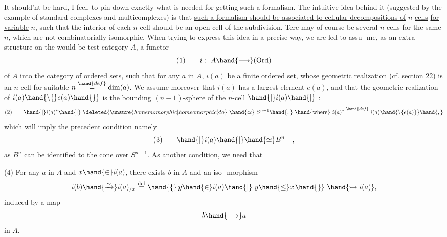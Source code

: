 
It should'nt be hard,  I feel,  to pin down exactly what is needed for
getting such a formalism.  The intuitive idea behind it (suggested by
the example of  standard complexes and multicomplexes)  is that
\uline{such a formalism should be associated to cellular decompositions of}
$n$-\uline{cells} \uline{for variable} $n$,  such that the interior of each $n$-cell should
be an open cell of the subdivision.  Tere may of course be several
$n$-cells for the same $n$,  which are not combinatorially isomorphic.
When trying to express this idea in a precise way,  we are led to assu-%
me,  as an extra structure on the would-be test category $A$,  a functor
\[ (1) \qquad i:\ A \hand{\longrightarrow} (\mathrm{Ord}) \]
of $A$ into the category of ordered sets,  such that for any $a$ in $A$,
$i(a)$ be a \uline{finite} ordered set,  whose geometric realization  (cf. section
22)  is an $n$-cell for suitable  $n \overset{\hand{def}}{=} \mathrm{dim}(a)$.  We assume moreover that
$i(a)$ has a largest element  $e(a)$,  and that the geometric realization
of  $i(a) \hand{\setminus\{} e(a) \hand{\}}$ is the bounding  $(n-1)$-sphere of the $n$-cell  $\hand{|} i(a) \hand{|}$ :
\[ (2) \qquad \hand{|} i(a)^{*} \hand{|}\ \deleted{\unsure{homemomorphic|homeomorphic} to}\ \hand{\simeq}\ S^{n-1} \hand{,}\ \hand{\text{where}}\ i(a)^{*} \overset{\hand{def}}{=} i(a) \hand{\setminus\{e(a)\}} \hand{,} \]
which will imply the precedent condition namely
\[ (3) \qquad \hand{|} i(a) \hand{|} \hand{\simeq} B^{n} \quad , \]
as $B^{n}$ can be identified to the cone over $S^{n-1}$.  As another condition,
we need that 

(4) \quad For any $a$ in $A$ and  $x \hand{\in} i(a)$,  there exists $b$ in $A$ and an iso-%
morphism
\[ i(b) \hand{\xrightarrow{\sim}} i(a)_{/x} \overset{\mathrm{def}}{=} \hand{\{}\, y \hand{\in} i(a) \hand{|}\ y \hand{\leq} x \,\hand{\}} \ \hand{\hookrightarrow i(a)}, \]
induced by a map
\[ b \hand{\longrightarrow} a \]
in $A$.

